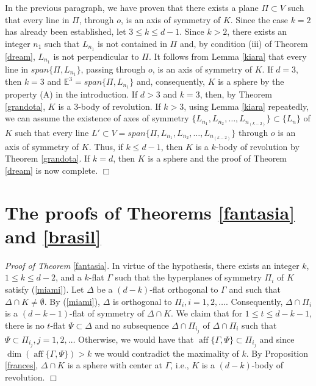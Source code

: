 \documentclass[12pt,thmsa]{amsart}
\newcommand{\Et}{\mathbb{E}^3}
\newcommand{\aff}{\operatorname*{aff}}
\begin{document}
In the previous paragraph, we have proven that there exists a plane $\Pi\subset V$ such that every line in $\Pi$, through $o$, is an axis of symmetry of $K$. Since the case $k=2$ has already been established, let  $3\leq k \leq d-1$. Since $k>2$, there exists an integer $n_1$ such that $L_{n_1}$ is not contained in $\Pi$ and, by condition (iii) of Theorem \ref{dream}, $L_{n_1}$ is not perpendicular to $\Pi$. It follows from Lemma \ref{kiara} that every line in 
$span\{\Pi, L_{n_1}\}$, passing through $o$, is an axis of symmetry of $K$. If $d=3$, then $k=3$ and $\Et=span\{\Pi, L_{n_1}\}$ and, consequently, $K$ is a sphere by the property (A) in the introduction.  %
If $d>3$ and $k=3$, then, by Theorem \ref{grandota}, $K$ is a 3-body of revolution. 
If $k>3$, using Lemma \ref{kiara} repeatedly, we can assume the existence of axes of symmetry $\{L_{n_1}, L_{n_2},\ldots,L_{n_{(k-2)}}\} \subset \{L_n\}$ of $K$ such that every line $L'\subset V=span\{\Pi, L_{n_1}, L_{n_2},\ldots,L_{n_{(k-2)}}\}$ through $o$ is an axis of symmetry of $K$. Thus, if $k\leq d-1$, then $K$ is a $k$-body of revolution by Theorem \ref{grandota}. If $k=d$, then $K$ is a sphere and the proof of Theorem \ref{dream} is now complete. $\Box$

\section{The proofs of Theorems \ref{fantasia} and \ref{brasil}}

\textit{Proof of Theorem} \ref{fantasia}.
In virtue of the hypothesis, there exists an integer $k$, $1\leq k \leq d-2$, and a $k$-flat 
$\Gamma$ such that the hyperplanes of symmetry $\Pi_i$ of $K$ satisfy (\ref{miami}). Let $\Delta$ be a 
$(d-k)$-flat orthogonal to $\Gamma$ and such that $\Delta \cap  K\not= \emptyset$. By (\ref{miami}), $\Delta$ is orthogonal to $\Pi_i, i=1,2,\ldots$. Consequently, $\Delta \cap \Pi_i$  is a $(d-k-1)$-flat of symmetry of $\Delta \cap K$. We claim that for  $1\leq t \leq d-k-1$, there is no $t$-flat $\Psi \subset \Delta$ and no subsequence $\Delta \cap \Pi_{i_j}$ of $\Delta \cap \Pi_i$ such that $ \Psi \subset  \Pi_{i_j}, j=1,2,\ldots$ Otherwise, we would have that $\aff\{ \Gamma, \Psi\}\subset \Pi_{i_j}$ and since  $\dim (\aff\{ \Gamma, \Psi\})>k$ we would contradict the maximality of $k$. By Proposition \ref{frances}, $\Delta \cap K$ is a sphere with center at $\Gamma$, i.e., $K$ is a $(d-k)$-body of revolution. 
 $\Box$    
 
\end{document}
